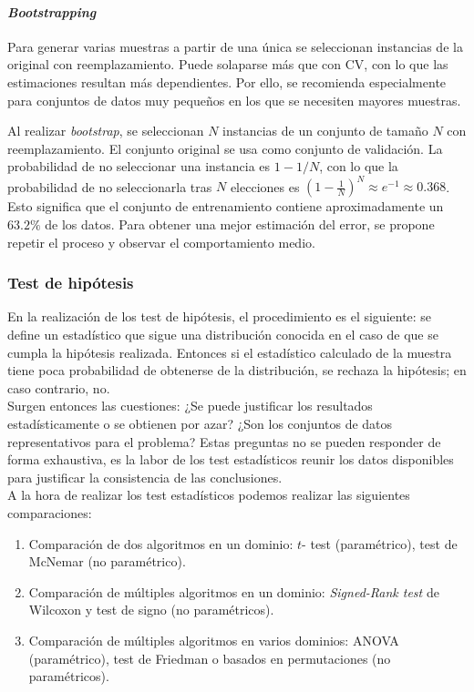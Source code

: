 \paragraph{\textit{Bootstrapping}} Para generar varias 
muestras a partir de una única se seleccionan instancias de 
la original con reemplazamiento. Puede solaparse más que con 
CV, con lo que las estimaciones resultan más dependientes. 
Por ello, se recomienda especialmente para conjuntos de datos 
muy pequeños en los que se necesiten mayores muestras. 

	Al realizar \textit{bootstrap}, se seleccionan $N$ 
instancias de un conjunto de tamaño $N$ con reemplazamiento. 
El conjunto original se usa como conjunto de validación. La 
probabilidad de no seleccionar una instancia es $1-1/N$, con 
lo que la probabilidad de no seleccionarla tras $N$ 
elecciones es $\left(1- \frac{1}{N}\right)^N \approx e^{-1} 
\approx 0.368$. Esto significa que el conjunto de 
entrenamiento contiene aproximadamente un $63.2\%$ de los 
datos. Para obtener una mejor estimación del error, se 
propone repetir el proceso y observar el comportamiento 
medio.
	
\subsubsection{Test de hipótesis}

	En la realización de los test de hipótesis, el 
procedimiento es el siguiente: se define un estadístico que 
sigue una distribución conocida en el caso de que se cumpla 
la hipótesis realizada. Entonces si el estadístico calculado 
de la muestra tiene poca probabilidad de obtenerse de la 
distribución, se rechaza la hipótesis; en caso contrario, no. 
\\
	Surgen entonces las cuestiones: ¿Se puede justificar los 
resultados estadísticamente o se obtienen por azar? ¿Son los 
conjuntos de datos representativos para el problema? Estas 
preguntas no se pueden responder de forma exhaustiva, es la 
labor de los test estadísticos reunir los datos disponibles 
para justificar la consistencia de las conclusiones. \\
	A la hora de realizar los test estadísticos podemos 
realizar las siguientes comparaciones:
	\begin{enumerate}
	\item Comparación de dos algoritmos en un dominio: $t$-
		test (paramétrico), test de McNemar (no paramétrico).
	\item Comparación de múltiples algoritmos en un dominio: 
		\textit{Signed-Rank test} de Wilcoxon y test de signo 
		(no paramétricos).
	\item Comparación de múltiples algoritmos en varios 
		dominios: ANOVA (paramétrico), test de Friedman o 
		basados en permutaciones (no paramétricos). 
	\end{enumerate}


